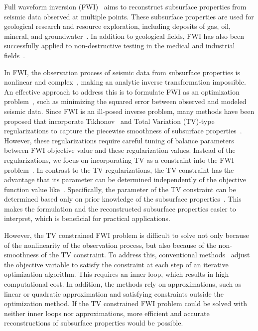 Full waveform inversion (FWI)~\cite{FWI0,FWI1} aims to reconstruct subsurface properties from seismic data observed at multiple points.
These subsurface properties are used for geological research and resource exploration, including deposits of gas, oil, mineral, and groundwater~\cite{FWI1,FWIApplicationGroundwater0,FWIApplicationGroundwater1}.
In addition to geological fields, FWI has also been successfully applied to non-destructive testing in the medical and industrial fields~\cite{FWIApplicationNonDestructiveTesting0,FWIApplicationNonDestructiveTesting1}.

In FWI, the observation process of seismic data from subsurface properties is nonlinear and complex~\cite{FWI1}, making an analytic inverse transformation impossible.
An effective approach to address this is to formulate FWI as an optimization problem~\cite{FWI0,CustomFWI0,CustomFWI1,CustomFWI2,CustomFWI3,CustomFWI4,CustomFWI5}, such as minimizing the squared error between observed and modeled seismic data.
Since FWI is an ill-posed inverse problem, many methods have been proposed that incorporate Tikhonov~\cite{tikhonov} and Total Variation (TV)-type~\cite{TV,TGV} regularizations to capture the piecewise smoothness of subsurface properties~\cite{FWI-with-tikhonov-regularization,FWI-with-TV-regularization,FWI-with-directional-TV-regularization,FWI-with-high-order-TV-regularization,FWI-with-TGV-regularization}.
However, these regularizations require careful tuning of balance parameters between FWI objective value and these regularization values.
Instead of the regularizations, we focus on incorporating TV as a constraint into the FWI problem~\cite{FWI-with-TV-constraint,FWI-with-TV-constraint2,FWI-with-TV-constraint3,FWI-with-TV-constraint4}.
In contrast to the TV regularizations, the TV constraint has the advantage that its parameter can be determined independently of the objective function value like~\cite{constraint0,constraint1,constraint2,constraint3,constraint4}.
Specifically, the parameter of the TV constraint can be determined based only on prior knowledge of the subsurface properties~\cite{constraints-vs-penalties-in-FWI}.
This makes the formulation and the reconstructed subsurface properties easier to interpret, which is beneficial for practical applications.

However, the TV constrained FWI problem is difficult to solve not only because of the nonlinearity of the observation process, but also because of the non-smoothness of the TV constraint.
To address this, conventional methods~\cite{FWI-with-TV-constraint,FWI-with-TV-constraint2,FWI-with-TV-constraint3,FWI-with-TV-constraint4} adjust the objective variable to satisfy the constraint at each step of an iterative optimization algorithm.
This requires an inner loop, which results in high computational cost.
In addition, the methods rely on approximations, such as linear or quadratic approximation and satisfying constraints outside the optimization method.
If the TV constrained FWI problem could be solved with neither inner loops nor approximations, more efficient and accurate reconstructions of subsurface properties would be possible.

